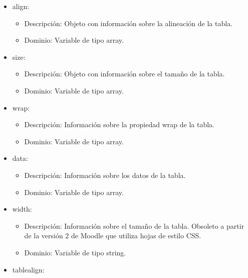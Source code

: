\begin{itemize}
\begin{itemize}
			\item align:
				\begin{itemize}
					\item Descripción: Objeto con información sobre la alineación de la tabla.
					\item Dominio: Variable de tipo array.
				\end{itemize}
		\end{itemize}
		\begin{itemize}
			\item size:
				\begin{itemize}
					\item Descripción: Objeto con información sobre el tamaño de la tabla.
					\item Dominio: Variable de tipo array.
				\end{itemize}
		\end{itemize}
		\begin{itemize}
			\item wrap:
				\begin{itemize}
					\item Descripción: Información sobre la propiedad wrap de la tabla.
					\item Dominio: Variable de tipo array.
				\end{itemize}
		\end{itemize}
		\begin{itemize}
			\item data:
				\begin{itemize}
					\item Descripción: Información sobre los datos de la tabla.
					\item Dominio: Variable de tipo array.
				\end{itemize}
		\end{itemize}
		\begin{itemize}
			\item width:
				\begin{itemize}
					\item Descripción: Información sobre el tamaño de la tabla. Obsoleto a partir de la versión 2 de Moodle que utiliza hojas de estilo CSS.
					\item Dominio: Variable de tipo string.
				\end{itemize}
		\end{itemize}
		\begin{itemize}
			\item tablealign:
				\begin{itemize}

\end{itemize}
\end{itemize}
\end{itemize}
